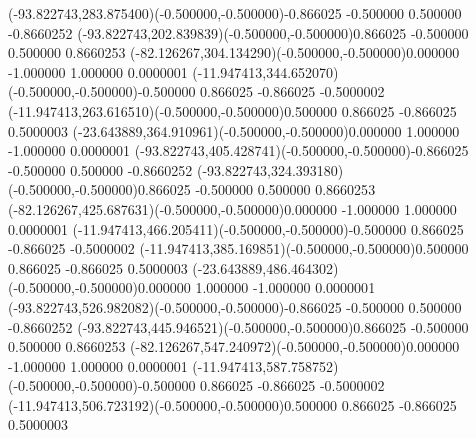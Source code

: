 \color{ASYcolor}
\fontsize{12.000000}{14.400000}\selectfont
\ASYalignT(-93.822743,283.875400)(-0.500000,-0.500000){-0.866025 -0.500000 0.500000 -0.866025}{2}%
\color{ASYcolor}
\fontsize{12.000000}{14.400000}\selectfont
\ASYalignT(-93.822743,202.839839)(-0.500000,-0.500000){0.866025 -0.500000 0.500000 0.866025}{3}%
\color{ASYcolor}
\fontsize{12.000000}{14.400000}\selectfont
\ASYalignT(-82.126267,304.134290)(-0.500000,-0.500000){0.000000 -1.000000 1.000000 0.000000}{1}%
\color{ASYcolor}
\fontsize{12.000000}{14.400000}\selectfont
\ASYalignT(-11.947413,344.652070)(-0.500000,-0.500000){-0.500000 0.866025 -0.866025 -0.500000}{2}%
\color{ASYcolor}
\fontsize{12.000000}{14.400000}\selectfont
\ASYalignT(-11.947413,263.616510)(-0.500000,-0.500000){0.500000 0.866025 -0.866025 0.500000}{3}%
\color{ASYcolor}
\fontsize{12.000000}{14.400000}\selectfont
\ASYalignT(-23.643889,364.910961)(-0.500000,-0.500000){0.000000 1.000000 -1.000000 0.000000}{1}%
\color{ASYcolor}
\fontsize{12.000000}{14.400000}\selectfont
\ASYalignT(-93.822743,405.428741)(-0.500000,-0.500000){-0.866025 -0.500000 0.500000 -0.866025}{2}%
\color{ASYcolor}
\fontsize{12.000000}{14.400000}\selectfont
\ASYalignT(-93.822743,324.393180)(-0.500000,-0.500000){0.866025 -0.500000 0.500000 0.866025}{3}%
\color{ASYcolor}
\fontsize{12.000000}{14.400000}\selectfont
\ASYalignT(-82.126267,425.687631)(-0.500000,-0.500000){0.000000 -1.000000 1.000000 0.000000}{1}%
\color{ASYcolor}
\fontsize{12.000000}{14.400000}\selectfont
\ASYalignT(-11.947413,466.205411)(-0.500000,-0.500000){-0.500000 0.866025 -0.866025 -0.500000}{2}%
\color{ASYcolor}
\fontsize{12.000000}{14.400000}\selectfont
\ASYalignT(-11.947413,385.169851)(-0.500000,-0.500000){0.500000 0.866025 -0.866025 0.500000}{3}%
\color{ASYcolor}
\fontsize{12.000000}{14.400000}\selectfont
\ASYalignT(-23.643889,486.464302)(-0.500000,-0.500000){0.000000 1.000000 -1.000000 0.000000}{1}%
\color{ASYcolor}
\fontsize{12.000000}{14.400000}\selectfont
\ASYalignT(-93.822743,526.982082)(-0.500000,-0.500000){-0.866025 -0.500000 0.500000 -0.866025}{2}%
\color{ASYcolor}
\fontsize{12.000000}{14.400000}\selectfont
\ASYalignT(-93.822743,445.946521)(-0.500000,-0.500000){0.866025 -0.500000 0.500000 0.866025}{3}%
\color{ASYcolor}
\fontsize{12.000000}{14.400000}\selectfont
\ASYalignT(-82.126267,547.240972)(-0.500000,-0.500000){0.000000 -1.000000 1.000000 0.000000}{1}%
\color{ASYcolor}
\fontsize{12.000000}{14.400000}\selectfont
\ASYalignT(-11.947413,587.758752)(-0.500000,-0.500000){-0.500000 0.866025 -0.866025 -0.500000}{2}%
\color{ASYcolor}
\fontsize{12.000000}{14.400000}\selectfont
\ASYalignT(-11.947413,506.723192)(-0.500000,-0.500000){0.500000 0.866025 -0.866025 0.500000}{3}%
